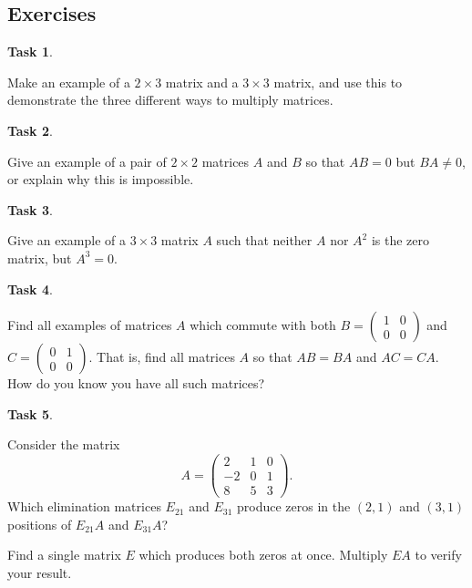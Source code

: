 \documentclass[10pt,]{book}
\theoremstyle{plain}
\theoremstyle{definition}
\numberwithin{equation}{section}
\newtheorem{task}{Task}[chapter]
\begin{document}
\subsection[Exercises]{Exercises}\label{subsection-40}
\begin{task}
\label{task-55}

        Make an example of a \(2\times 3\) matrix and a \(3\times 3\)
        matrix, and use this to demonstrate the three different ways to multiply
        matrices.
      \end{task}
\begin{task}
\label{task-56}

        Give an example of a pair of \(2\times 2\) matrices \(A\) and
        \(B\) so that \(AB = 0\) but \(BA\neq 0\), or explain why
        this is  impossible.
      \end{task}
\begin{task}
\label{task-57}

        Give an example of a \(3\times 3\) matrix \(A\) such that neither
        \(A\) nor \(A^2\) is the zero matrix, but \(A^3=0\).
      \end{task}
\begin{task}
\label{task-58}

        Find all examples of matrices \(A\) which commute with both
        \(B = \left( \begin{smallmatrix} 1 & 0 \\ 0 & 0
          \end{smallmatrix}\right)\) and
        \(C = \left( \begin{smallmatrix} 0 & 1 \\ 0 & 0
          \end{smallmatrix}\right)\). That is, find all matrices \(A\)
        so that \(AB = BA\) and \(AC= CA\). How do you know you have
        all such matrices?
      \end{task}
\begin{task}
\label{task-59}

          Consider the matrix
          \[
            A = \begin{pmatrix} 2 & 1 & 0 \\ -2 & 0 & 1 \\ 8 & 5 & 3 \end{pmatrix}.
          \]
          Which elimination matrices \(E_{21}\) and \(E_{31}\) produce zeros in the
          \((2,1)\) and \((3,1)\) positions of \(E_{21}A\)
          and \(E_{31}A\)?
\par

          Find a single matrix \(E\) which produces both zeros at once.
          Multiply \(EA\) to verify your result.
\end{task}
\end{document}
